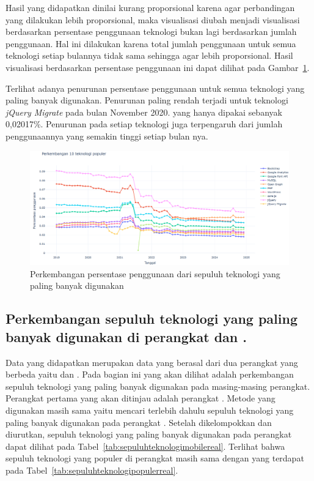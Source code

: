 Hasil yang didapatkan dinilai kurang proporsional karena agar perbandingan yang dilakukan lebih proporsional, maka visualisasi diubah menjadi visualisasi berdasarkan persentase penggunaan teknologi bukan lagi berdasarkan jumlah penggunaan. Hal ini dilakukan karena total jumlah penggunaan untuk semua teknologi setiap bulannya tidak sama sehingga agar lebih proporsional. Hasil visualisasi berdasarkan persentase penggunaan ini dapat dilihat pada Gambar~\ref{fig:persentasereal}.

Terlihat adanya penurunan persentase penggunaan untuk semua teknologi yang paling banyak digunakan. Penurunan paling rendah terjadi untuk teknologi \textit{jQuery Migrate} pada bulan November 2020. yang hanya dipakai sebanyak 0,02017\%. Penurunan pada setiap teknologi juga terpengaruh dari jumlah penggunaannya yang semakin tinggi setiap bulan nya.  

\begin{figure}[H]
    \centering
    \includegraphics[width=0.7\linewidth]{Gambar/Perkembangan persentase penggunaan real.png}
    \caption{Perkembangan persentase penggunaan dari sepuluh teknologi yang paling banyak digunakan}
    \label{fig:persentasereal}
\end{figure}

\subsection{Perkembangan sepuluh teknologi yang paling banyak digunakan di perangkat \desktop dan \mobile.}
\label{subsec:perkembangansepuluhteknologimobile}

Data yang didapatkan merupakan data yang berasal dari dua perangkat yang berbeda yaitu \mobile dan \desktop. Pada bagian ini yang akan dilihat adalah perkembangan sepuluh teknologi yang paling banyak digunakan pada masing-masing perangkat. Perangkat pertama yang akan ditinjau adalah perangkat \mobile. Metode yang digunakan masih sama yaitu mencari terlebih dahulu sepuluh teknologi yang paling banyak digunakan pada perangkat \mobile. Setelah dikelompokkan dan diurutkan, sepuluh teknologi yang paling banyak digunakan pada perangkat \mobile dapat dilihat pada Tabel~\ref{tab:sepuluhteknologimobilereal}. Terlihat bahwa sepuluh teknologi yang populer di perangkat \mobile masih sama dengan yang terdapat pada Tabel~\ref{tab:sepuluhteknologipopulerreal}.

